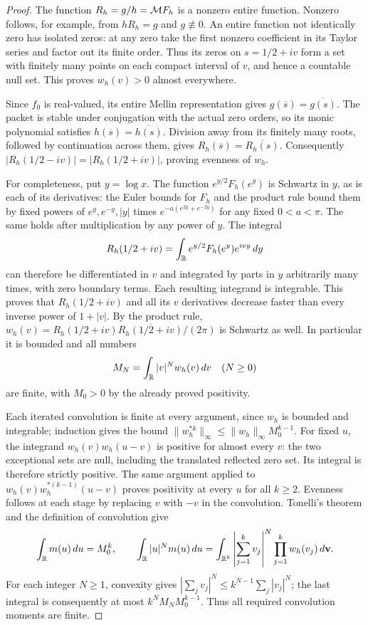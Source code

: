 \documentclass[11pt]{article}
\begin{document}
\begin{proof}
The function $R_h=g/h=\mathcal M F_h$ is a nonzero entire function.
Nonzero follows, for example, from $hR_h=g$ and $g\not\equiv0$.
An entire function not identically zero has isolated zeros:
at any zero take the first nonzero coefficient in its Taylor
series and factor out its finite order.  Thus its zeros on
$s=1/2+iv$ form a set with finitely many points on each compact
interval of $v$, and hence a countable null set.  This proves
$w_h(v)>0$ almost everywhere.

Since $f_0$ is real-valued, its entire Mellin representation
gives $g(\overline s)=\overline{g(s)}$.  The packet is stable
under conjugation with the actual zero orders, so its monic
polynomial satisfies $h(\overline s)=\overline{h(s)}$.
Division away from its finitely many roots, followed by
continuation across them, gives
$R_h(\overline s)=\overline{R_h(s)}$.  Consequently
$|R_h(1/2-iv)|=|R_h(1/2+iv)|$, proving evenness of $w_h$.

For completeness, put $y=\log x$.  The function
$e^{y/2}F_h(e^y)$ is Schwartz in $y$, as is each of its
derivatives: the Euler bounds for $F_h$ and the product rule
bound them by fixed powers of $e^y,e^{-y},|y|$ times
$e^{-a(e^{2y}+e^{-2y})}$ for any fixed $0<a<\pi$.
The same holds after multiplication by any power of $y$.
The integral
\[
 R_h(1/2+iv)=\int_\mathbb R e^{y/2}F_h(e^y)e^{ivy}\,dy
\]
can therefore be differentiated in $v$ and integrated by parts
in $y$ arbitrarily many times, with zero boundary terms.
Each resulting integrand is integrable.  This proves that
$R_h(1/2+iv)$ and all its $v$ derivatives decrease faster
than every inverse power of $1+|v|$.  By the product rule,
$w_h(v)=R_h(1/2+iv)\overline{R_h(1/2+iv)}/(2\pi)$ is
Schwartz as well.  In particular it is bounded and all numbers
\[
 M_N=\int_\mathbb R |v|^N w_h(v)\,dv\quad(N\geq0)
\]
are finite, with $M_0>0$ by the already proved positivity.

Each iterated convolution is finite at every argument, since
$w_h$ is bounded and integrable; induction gives the bound
$\|w_h^{*k}\|_\infty\leq\|w_h\|_\infty M_0^{k-1}$.
For fixed $u$, the integrand $w_h(v)w_h(u-v)$ is positive
for almost every $v$: the two exceptional sets are null,
including the translated reflected zero set.  Its integral is
therefore strictly positive.  The same argument applied to
$w_h(v)w_h^{*(k-1)}(u-v)$ proves positivity at every $u$ for
all $k\geq2$.  Evenness follows at each stage by replacing
$v$ with $-v$ in the convolution.  Tonelli's theorem and the
definition of convolution give
\[
 \int_\mathbb R m(u)\,du=M_0^k,\qquad
 \int_\mathbb R |u|^N m(u)\,du
 =\int_{\mathbb R^k}\left|\sum_{j=1}^kv_j\right|^N
                         \prod_{j=1}^kw_h(v_j)\,d\mathbf v.
\]
For each integer $N\geq1$, convexity gives
$|\sum_jv_j|^N\leq k^{N-1}\sum_j|v_j|^N$; the last
integral is consequently at most $k^NM_NM_0^{k-1}$.
Thus all required convolution moments are finite.


\end{proof}
\end{document}
